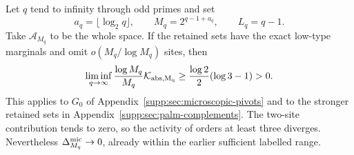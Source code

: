 \begin{theorem}\label{supp:palm:thm:cumulant-obstruction}
Let $q$ tend to infinity through odd primes and set
\[
 a_q=\lfloor\log_2q\rfloor,\qquad M_q=2^{q-1+a_q},\qquad L_q=q-1.
\]
Take $\mathcal A_{M_q}$ to be the whole space. If the retained sets have the exact low-type marginals and omit $o(M_q/\log M_q)$ sites, then
\begin{equation}\label{supp:palm:eq:cumulant-obstruction}
 \liminf_{q\to\infty}\frac{\log M_q}{M_q}\mathcal K_{\rm abs,M_q}
 \ge\frac{\log2}{2}(\log3-1)>0.
\end{equation}
This applies to $G_0$ of Appendix~\ref{supp:sec:microscopic-pivots} and to the stronger retained sets in Appendix~\ref{supp:sec:palm-complements}. The two-site contribution tends to zero, so the activity of orders at least three diverges. Nevertheless $\Delta_{M_q}^{\rm mic}\to0$, already within the earlier sufficient labelled range.
\end{theorem}
